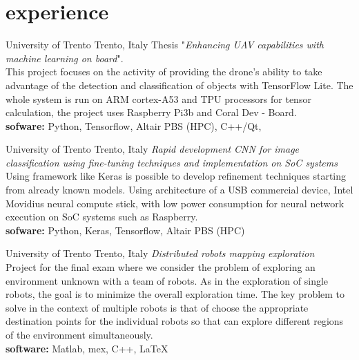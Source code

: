 \documentclass[]{friggeri-cv} %
\begin{document}
\section{experience}
  \begin{entrylist}
    {University of Trento}
    {Trento, Italy}
    {Thesis "\emph{Enhancing UAV capabilities with machine learning on board}".\\
    This project focuses on the activity of providing the drone's ability to take advantage of the detection and classification of objects with TensorFlow Lite.
The whole system is run on ARM cortex-A53 and TPU processors for
tensor calculation, the project uses Raspberry Pi3b and Coral Dev - Board. \\
    \textbf{sofware:} Python, Tensorflow, Altair PBS (HPC), C++/Qt, \quad
    \href{https://github.com/frank1789/MasterThesis}{\faGithub}
    }
    

    { University of Trento}
    {Trento, Italy}
    {\emph{Rapid development CNN for image classification using fine-tuning techniques and
     implementation on SoC systems}\\
    Using framework like Keras is possible to develop refinement techniques starting
    from already known models. Using architecture of a USB commercial device,
    Intel Movidius neural compute stick, with low power consumption for neural network execution
    on SoC systems such as Raspberry.\\
    \textbf{sofware:} Python, Keras, Tensorflow, Altair PBS (HPC)\quad
    \href{https://github.com/frank1789/NeuralNetworks}{\faGithub}}
      

    {University of Trento}
    {Trento, Italy}
    {\emph{Distributed robots mapping exploration}\\
    Project for the final exam where we consider the problem of exploring
    an environment unknown with a team of robots. As in the exploration of
    single robots, the goal is to minimize the overall exploration time.
    The key problem to solve in the context of multiple robots is that of choose
    the appropriate destination points for the individual robots so that can explore
    different regions of the environment simultaneously.\\
    \textbf{software: } Matlab, mex, C++, \LaTeX \quad
    \href{https://github.com/frank1789/DistributedSystemProject}{\faGithub}}
      
  \end{entrylist}
\end{document}
